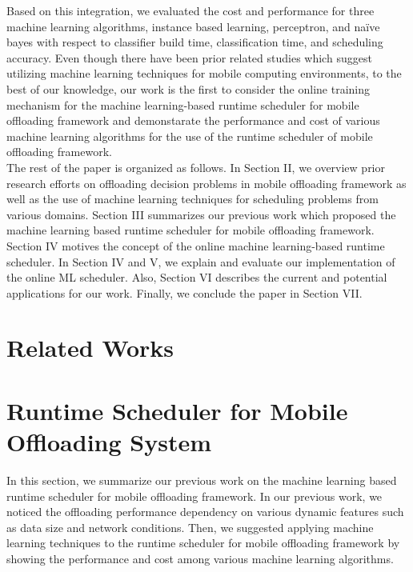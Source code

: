 \documentclass[10pt, conference, compsocconf]{IEEEtran}
\begin{document}
%
Based on this integration, we evaluated the cost and performance for
three machine learning algorithms, instance based learning, perceptron,
and na\"{i}ve bayes with respect to classifier build time,
classification time, and scheduling accuracy.
%
Even though there have been prior related studies which suggest
utilizing machine learning techniques for mobile computing environments,
to the best of our knowledge, our work is the first to consider the
online training mechanism for the machine learning-based runtime
scheduler for mobile offloading framework and demonstarate the
performance and cost of various machine learning algorithms for the use
of the runtime scheduler of mobile offloading framework.\\   
%
\indent The rest of the paper is organized  as follows.
%
In Section II, we overview prior research efforts on offloading decision
problems in mobile offloading framework as well as the use of machine
learning techniques for scheduling problems from various domains.
%
Section III summarizes our previous work which proposed the machine
learning based runtime scheduler for mobile offloading framework.
%
Section IV motives the concept of the online machine learning-based
runtime scheduler.
%
In Section IV and V, we explain and evaluate our implementation of the
online ML scheduler.
%
Also, Section VI describes the current and potential applications for
our work.
%
Finally, we conclude the paper in Section VII.
%
\section{Related Works}
%
\section{Runtime Scheduler for Mobile Offloading System}
%
In this section, we summarize our previous work on the machine learning
based runtime scheduler for mobile offloading framework.
%
In our previous work, we noticed the offloading performance dependency on
various dynamic features such as data size and network conditions.
%
Then, we suggested applying machine learning techniques to the runtime
scheduler for mobile offloading framework by showing the performance and
cost among various machine learning algorithms. 
% 
\end{document}
